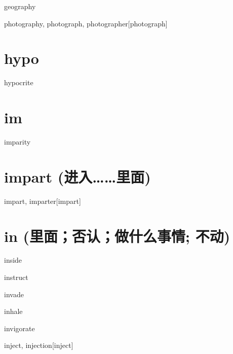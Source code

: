 \begin{RefWord}{geography}
\end{RefWord}

\begin{RefWord}{photography, photograph, photographer}[photograph]
\end{RefWord}

\section{hypo}

\begin{RefWord}{hypocrite}
\end{RefWord}

\section{im}

\begin{RefWord}{imparity}
\end{RefWord}

\section{impart (进入……里面)}
\begin{RefWord}{impart, imparter}[impart]
\end{RefWord}

\section{in (里面；否认；做什么事情; 不动)}

\begin{RefWord}{inside}
\end{RefWord}

\begin{RefWord}{instruct}
\end{RefWord}

\begin{RefWord}{invade}
\end{RefWord}

\begin{RefWord}{inhale}
\end{RefWord}

\begin{RefWord}{invigorate}
\end{RefWord}

\begin{RefWord}{inject, injection}[inject]
\end{RefWord}

